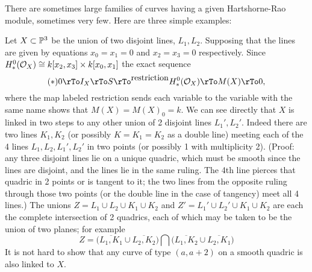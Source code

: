 There are sometimes large families of curves having a given Hartshorne-Rao module, sometimes very few. Here are three simple examples:

\begin{example}\label{2 lines}
 Let $X\subset \PP^3$ be the union of two disjoint lines, $L_1,L_2$. Supposing that the lines are given by equations $x_0=x_1=0$ and $x_2=x_3=0$ respectively. Since $H^0_*(\sO_X) \cong k[x_2,x_3] \times k[x_0,x_1]$ the exact sequence
 $$
 (*)  0\rTo I_X \rTo S \rTo^{\hbox{restriction}} H^0_*(\sO_X) \rTo M(X) \rTo  0,
 $$
where the map labeled restriction sends each variable to the variable with the same name shows that $M(X) = M(X)_0 =k$.
We can see directly that $X$ is linked in two steps to any other union of 2 disjoint lines $L_1',L_2'$. Indeed there are two lines $K_1,K_2$ (or possibly $K = K_1 = K_2$ as a double line) meeting each of the 4 lines $L_1,L_2,L_1', L_2'$ in two points (or possibly 1 with multiplicity 2). (Proof: any three disjoint lines lie on a  unique quadric, which must be smooth since the lines are disjoint, and the lines lie in the same ruling. The 4th line pierces that quadric in 2 points or is tangent to it; the two lines from the opposite ruling through those two points (or the double line in the case of tangency) meet all 4 lines.) The unions $Z = L_1\cup L_2\cup K_1\cup K_2$ and 
$Z' = L_1'\cup L_2'\cup K_1\cup K_{2}$ are each the complete intersection of 2 quadrics, each of which may be taken to be the union of two planes; for example 
$$
Z = \bigl(\overline{L_1,K_1} \cup \overline{L_2, K_2}\bigr)\bigcap\bigl( \overline{L_1,K_2} \cup \overline{L_2, K_1}\bigr)
$$
It is not hard to show that any curve of type $(a,a+2)$ on a smooth quadric is also linked to $X$. 
\end{example}

